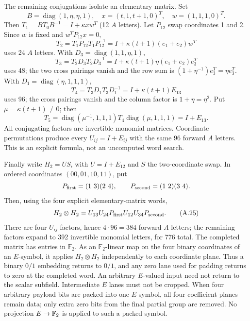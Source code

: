 The remaining conjugations isolate an elementary matrix. Set
\[
 B=\operatorname{diag}(1,\eta,\eta,1),\quad
 x=(t,1,t+1,0)^T,\quad w=(1,1,1,0)^T.
\]
Then $T_1=BT_0B^{-1}=I+\kappa xw^T$ (12 $A$ letters). Let $P_{12}$
swap coordinates 1 and 2. Since $w$ is fixed and $w^TP_{12}x=0$,
\[
 T_2=T_1P_{12}T_1P_{12}^{-1}
   =I+\kappa(t+1)(e_1+e_2)w^T                       \tag{A.21}
\]
uses 24 $A$ letters. With $D_3=\operatorname{diag}(1,1,\eta,1)$,
\[
 T_3=T_2D_3T_2D_3^{-1}
   =I+\kappa(t+1)\eta(e_1+e_2)e_3^T                \tag{A.22}
\]
uses 48; the two cross pairings vanish and the row sum is
$(1+\eta^{-1})e_3^T=\eta e_3^T$. With
$D_1=\operatorname{diag}(\eta,1,1,1)$,
\[
 T_4=T_3D_1T_3D_1^{-1}
   =I+\kappa(t+1)E_{13}                             \tag{A.23}
\]
uses 96; the cross pairings vanish and the column factor is
$1+\eta=\eta^2$. Put $\mu=\kappa(t+1)\ne0$; then
\[
 T_5=\operatorname{diag}(\mu^{-1},1,1,1)
       T_4\operatorname{diag}(\mu,1,1,1)=I+E_{13}.  \tag{A.24}
\]
All conjugating factors are invertible monomial matrices. Coordinate
permutations produce every $U_{ij}=I+E_{ij}$ with the same 96 forward
$A$ letters. This is an explicit formula, not an uncomputed word search.

Finally write $H_2=US$, with $U=I+E_{12}$ and $S$ the two-coordinate
swap. In ordered coordinates $(00,01,10,11)$, put
\[
 P_{\rm first}=(1\ 3)(2\ 4),\qquad
 P_{\rm second}=(1\ 2)(3\ 4).
\]
Then, using the four explicit elementary-matrix words,
\[
 H_2\otimes H_2
 =U_{13}U_{24}P_{\rm first}U_{12}U_{34}P_{\rm second}.       \tag{A.25}
\]
There are four $U_{ij}$ factors, hence $4\cdot96=384$ forward $A$
letters; the remaining factors expand to 392 invertible monomial
letters, for 776 total. The completed matrix has entries in $\mathbb F_2$.
As an $\mathbb F_2$-linear map on the four binary coordinates of an
$E$-symbol, it applies $H_2\otimes H_2$ independently to each coordinate
plane. Thus a binary $0/1$ embedding returns to $0/1$, and any zero lane
used for padding returns to zero at the completed word. An arbitrary
$E$-valued input need not return to the scalar subfield. Intermediate
$E$ lanes must not be cropped.
When four arbitrary payload bits are packed into one $E$ symbol,
all four coefficient planes remain data; only extra zero bits from
the final partial group are removed. No projection $E\to\mathbb F_2$
is applied to such a packed symbol.


